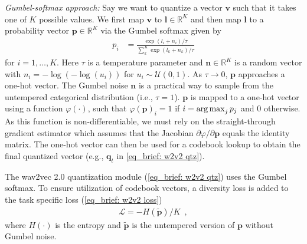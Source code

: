 {\textit{Gumbel-softmax approach:} 
Say we want to quantize a vector $\mathbf{v}$ such that it takes one of $K$ possible values. We first map $\mathbf{v}$ to $\mathbf{l} \in \mathbb{R}^K$ and then map $\mathbf{l}$ to a probability vector $\mathbf{p} \in \mathbb{R}^K$ via the Gumbel softmax given by
\begin{align}
    p_i &= \frac{\exp(l_i + n_i) / \tau}{\sum_k^K \exp(l_k + n_k) / \tau} 
\end{align}
for $i=1,\dots,K$. Here $\tau$ is a temperature parameter and $\mathbf{n}\in\mathbb R^K$ is a random vector with $n_i = -\log(-\log(u_i))$ for $u_i \sim \mathcal{U}(0, 1)$.
As  $\tau \rightarrow 0$, $\mathbf{p}$ approaches a one-hot vector. The Gumbel noise $\mathbf{n}$ is a practical way to sample from the untempered categorical distribution (i.e., $\tau = 1$).
$\mathbf{p}$ is mapped to a one-hot vector using a function $\varphi(\cdot)$, such that $\varphi(\mathbf{p})_i = 1$ if $i = \operatorname*{arg\,max}_j p_j$ and $0$ otherwise. 
As this function is non-differentiable, we must rely on the straight-through gradient estimator \parencite{bengio_estimating_2013} which assumes that the Jacobian ${\partial \varphi}/{\partial \mathbf{p}}$ equals the identity matrix. 
The one-hot vector can then be used for a codebook lookup to obtain the final quantized vector (e.g., $\mathbf{q}_t$ in \cref{eq_brief: w2v2 qtz}).

The wav2vec 2.0 quantization module (\cref{eq_brief: w2v2 qtz}) uses the Gumbel softmax. To ensure utilization of codebook vectors, a diversity loss is added to the task specific loss (\cref{eq_brief: w2v2 loss})
%
\begin{align}
    \mathcal{L} =  - H(\widetilde{\mathbf{p}}) / K \enspace,
\end{align}
\noindent where $H(\cdot)$ is the entropy and $\widetilde{\mathbf{p}}$ is the untempered version of $\mathbf{p}$ without Gumbel noise.

}
